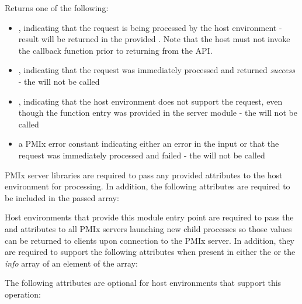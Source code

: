 Returns one of the following:

\begin{itemize}
    \item {}, indicating that the request is being processed by the host environment - result will be returned in the provided . Note that the host must not invoke the callback function prior to returning from the \ac{API}.
    \item {}, indicating that the request was immediately processed and returned \textit{success} - the  will not be called
    \item {}, indicating that the host environment does not support the request, even though the function entry was provided in the server module - the  will not be called
    \item a PMIx error constant indicating either an error in the input or that the request was immediately processed and failed - the  will not be called
\end{itemize}

\reqattrstart
\ac{PMIx} server libraries are required to pass any provided attributes to the host environment for processing. In addition, the following attributes are required to be included in the passed  array:


\divider

Host environments that provide this module entry point are required to pass the  and  attributes to all \ac{PMIx} servers launching new child processes so those values can be returned to clients upon connection to the \ac{PMIx} server. In addition, they are required to support the following attributes when present in either the  or the \textit{info} array of an element of the  array:


\reqattrend

\optattrstart
The following attributes are optional for host environments that support this operation:

